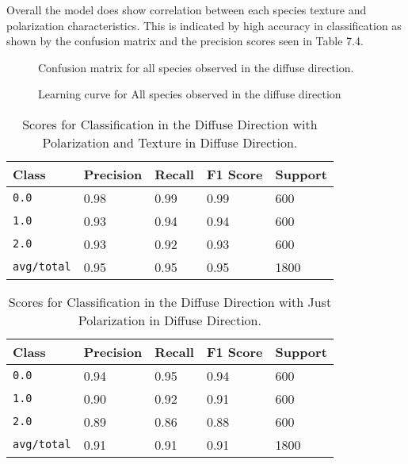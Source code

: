Overall the model does show correlation between each species texture and polarization characteristics.  This is indicated by high accuracy in classification as shown by the confusion matrix and the precision scores seen in Table 7.4.
%
\begin{figure}[!htb]
    \begin{center}
    \end{center}
    \caption{Confusion matrix for all species observed in the diffuse direction.}
    \label{fig:polarization}
\end{figure}
%
%
\begin{figure}[!htb]
    \begin{center}
    \end{center}
    \caption{Learning curve for All species observed in the diffuse direction}
    \label{fig:polarization}
\end{figure}
%
%
\begin{table}[htb]
  \centering
  \begin{tabular}{lllll}
    \toprule
    \textbf{Class} & \textbf{Precision} & \textbf{Recall} & \textbf{F1 Score} & \textbf{Support} \\
    \midrule
      \texttt{0.0} & 0.98 & 0.99 & 0.99 & 600 \\
      \texttt{1.0} & 0.93 & 0.94 & 0.94 & 600 \\
      \texttt{2.0} & 0.93 & 0.92 & 0.93 & 600 \\
      \texttt{avg/total} & 0.95 & 0.95 & 0.95 & 1800 \\
    \bottomrule
  \end{tabular}
  \caption{%
    Scores for Classification in the Diffuse Direction with Polarization and Texture in Diffuse Direction.
  }
  \label{tab:Packages}
\end{table}
\begin{table}[htb]
  \centering
  \begin{tabular}{lllll}
    \toprule
    \textbf{Class} & \textbf{Precision} & \textbf{Recall} & \textbf{F1 Score} & Support\\
    \midrule
      \texttt{0.0} & 0.94 & 0.95 & 0.94 & 600 \\
      \texttt{1.0} & 0.90 & 0.92 & 0.91 & 600 \\
      \texttt{2.0} & 0.89 & 0.86 & 0.88 & 600 \\
      \texttt{avg/total} & 0.91 & 0.91 & 0.91 & 1800 \\
    \bottomrule
  \end{tabular}
  \caption{%
    Scores for Classification in the Diffuse Direction with Just Polarization in Diffuse Direction.
  }
  \label{tab:Packages}
\end{table}

